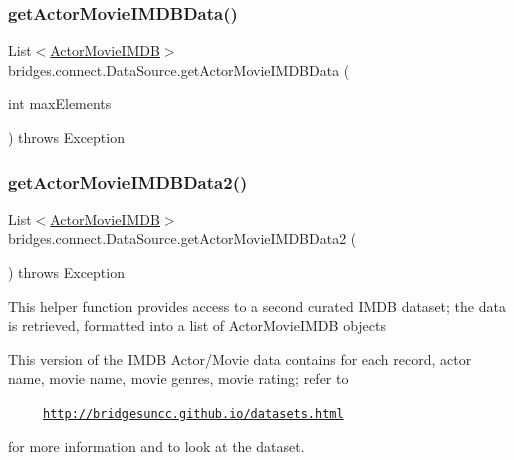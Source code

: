 \subsubsection{\texorpdfstring{get\+Actor\+Movie\+I\+M\+D\+B\+Data()}{getActorMovieIMDBData()}\hspace{0.1cm}{\footnotesize\ttfamily [2/2]}}
{\footnotesize\ttfamily List$<$\hyperlink{classbridges_1_1data__src__dependent_1_1_actor_movie_i_m_d_b}{Actor\+Movie\+I\+M\+DB}$>$ bridges.\+connect.\+Data\+Source.\+get\+Actor\+Movie\+I\+M\+D\+B\+Data (\begin{DoxyParamCaption}\item[{int}]{max\+Elements }\end{DoxyParamCaption}) throws Exception}

\mbox{\label{classbridges_1_1connect_1_1_data_source_ae44e4ed7879e2755f8c66a335d8b6ad5}} 
\subsubsection{\texorpdfstring{get\+Actor\+Movie\+I\+M\+D\+B\+Data2()}{getActorMovieIMDBData2()}}
{\footnotesize\ttfamily List$<$\hyperlink{classbridges_1_1data__src__dependent_1_1_actor_movie_i_m_d_b}{Actor\+Movie\+I\+M\+DB}$>$ bridges.\+connect.\+Data\+Source.\+get\+Actor\+Movie\+I\+M\+D\+B\+Data2 (\begin{DoxyParamCaption}{ }\end{DoxyParamCaption}) throws Exception}

This helper function provides access to a second curated I\+M\+DB dataset; the data is retrieved, formatted into a list of Actor\+Movie\+I\+M\+DB objects

This version of the I\+M\+DB Actor/\+Movie data contains for each record, actor name, movie name, movie genres, movie rating; refer to 

~~~~~\href{http://bridgesuncc.github.io/datasets.html}{\tt http\+://bridgesuncc.\+github.\+io/datasets.\+html} 

for more information and to look at the dataset.


